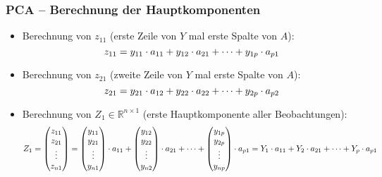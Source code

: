 \begin{frame}

\frametitle{PCA -- Berechnung der Hauptkomponenten}

\begin{itemize}
\setlength{\itemsep}{5pt}
\item Berechnung von $z_{11}$ (erste Zeile von $Y$ mal erste Spalte von $A$):
\begin{equation}
z_{11} = y_{11} \cdot a_{11} + y_{12} \cdot a_{21} + \cdots + y_{1p} \cdot a_{p1} \notag
\end{equation}
\item Berechnung von $z_{21}$ (zweite Zeile von $Y$ mal erste Spalte von $A$):
\begin{equation}
z_{21} = y_{21} \cdot a_{12} + y_{22} \cdot a_{22} + \cdots + y_{2p} \cdot a_{p2} \notag
\end{equation}
\item Berechnung von $Z_1 \in \mathbb{R}^{n \times 1}$ (erste Hauptkomponente aller Beobachtungen): 
\begin{equation}
Z_1 = \begin{pmatrix} z_{11} \\ z_{21} \\ \vdots \\ z_{n1} \end{pmatrix} = \begin{pmatrix} y_{11} \\ y_{21} \\ \vdots \\ y_{n1} \end{pmatrix} \cdot a_{11} + \begin{pmatrix} y_{12} \\ y_{22} \\ \vdots \\ y_{n2} \end{pmatrix} \cdot a_{21} + \cdots + \begin{pmatrix} y_{1p} \\ y_{2p} \\ \vdots \\ y_{np} \end{pmatrix} \cdot a_{p1} = Y_1 \cdot a_{11} + Y_2 \cdot a_{21} + \cdots + Y_p \cdot a_{p1} \notag
\end{equation}
\end{itemize}
\end{frame}







